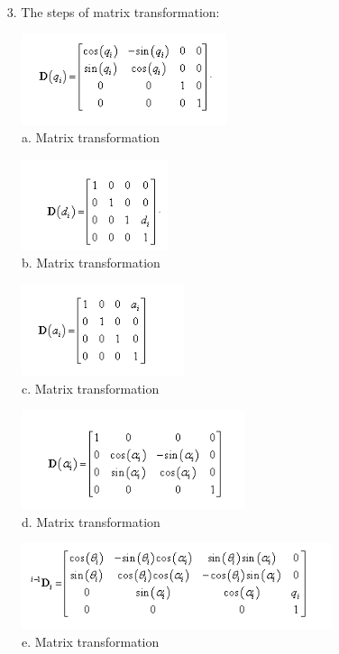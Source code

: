 		\begin{enumerate}
			\item [3.] The steps of matrix transformation: \\
		\end{enumerate} 

		\begin{figure}[H]
			\centering
			\includegraphics[scale=1.2]{./images/denavit1}
			\caption{a. Matrix transformation}
		\end{figure}
		\begin{figure}[H]
			\centering
			\includegraphics[scale=1.2]{./images/denavit2}
			\caption{b. Matrix transformation}
		\end{figure}
		\begin{figure}[H]
			\centering
			\includegraphics[scale=1.2]{./images/denavit3}
			\caption{c. Matrix transformation}
		\end{figure}
		\begin{figure}[H]
			\centering
			\includegraphics[scale=1.2]{./images/denavit4}
			\caption{d. Matrix transformation}
		\end{figure}
		\begin{figure}[H]
			\centering
			\includegraphics[scale=1.2]{./images/denavit5}
			\caption{e. Matrix transformation}
		\end{figure}
		
